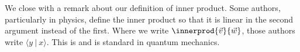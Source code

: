 

We close with a remark about our definition of inner product.
Some authors, particularly in physics, define the inner product 
so that it is linear in the second argument instead of the first. 
Where we write $\innerprod{\vec{v}}{\vec{w}}$, 
those authors write $\langle y\ |\ x\rangle$. 
This is 
and is standard in quantum mechanics.


